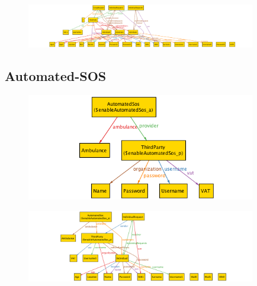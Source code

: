 \documentclass[a4paper]{article}
\begin{document}
    \begin{figure}[!htpb]
    	\centering
    	\includegraphics[width=100mm]{images/alloy/Data4HelpComplete.png}
    \end{figure}

\subsection{Automated-SOS}
    
    
    
    
    \begin{figure}[!htpb]
    	\centering
    	\includegraphics[width=100mm]{images/alloy/enableAutomatedSos.png}
    \end{figure}
    
    
    
    \begin{figure}[!h]
    	\centering
    	\includegraphics[width=100mm]{images/alloy/runAutomatedSos.png}
    \end{figure}
    \newpage
    
    
\end{document}
